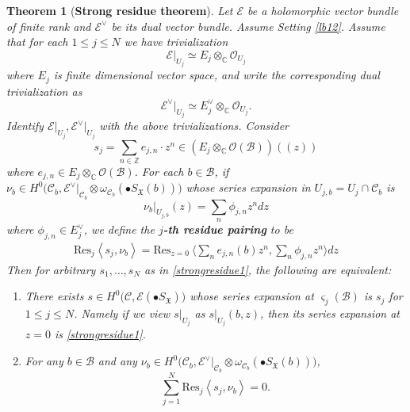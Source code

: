 \documentclass[11pt,b5paper,notitlepage]{article}
\theoremstyle{definition}
\theoremstyle{plain}
\newtheorem{thm}[df]{Theorem}
\newcommand{\mc}{\mathcal}
\newcommand{\Res}{\mathrm{Res}}
\newcommand{\scr}{\mathscr}
\newcommand{\blt}{\bullet}
\newcommand{\Cbb}{\mathbb C}
\newcommand{\Zbb}{\mathbb Z}
\newcommand{\<}{\left\langle}
\renewcommand{\>}{\right\rangle}
\newcommand{\MO}{\mathcal{O}}
\newcommand{\MC}{\mathcal{C}}
\newcommand{\MB}{\mathcal{B}}
\newcommand{\fx}{\mathfrak{X}}
\newcommand{\Bigbk}[1]{\Big\langle {#1}\Big\rangle}
\numberwithin{equation}{section}
\begin{document}
\begin{thm}[\textbf{Strong residue theorem}] \label{strongresidue} \label{lb88}
 Let $\scr E$ be a holomorphic vector bundle of finite rank and $\scr E^\vee$ be its dual vector bundle. Assume Setting \ref{lb12}. Assume that for each $1\leq j\leq N$ we have trivialization
    \begin{equation}\label{strongresidue2}
    \scr E\vert_{U_j}\simeq E_j\otimes_\Cbb \MO_{U_j}
    \end{equation}
where $E_j$ is finite dimensional vector space, and write the corresponding dual trivialization as
    \begin{equation}\label{strongresidue3}
    \scr E^{\vee}\vert_{U_j}\simeq E_j^\vee\otimes_\Cbb \MO_{U_j}.
    \end{equation}
Identify $\scr E\vert_{U_j},\scr E^\vee\vert_{U_j}$ with the above trivializations. Consider
    \begin{equation}\label{strongresidue1}
    s_j=\sum_{n\in \Zbb}e_{j,n}\cdot z^n\in (E_j\otimes_\Cbb \MO(\MB))((z))
    \end{equation}
where $e_{j,n}\in E_j\otimes_\Cbb\mc O(\mc B)$.  For each $b\in \MB$, if $\nu_b\in H^0\big(\MC_b,\scr E^\vee\vert_{\MC_b}\otimes \omega_{\MC_b}(\blt S_\fx(b))\big)$ whose series expansion in $U_{j,b}=U_j\cap \MC_b$ is 
    $$
    \nu_b\vert_{U_{j,b}}(z)=\sum_n \phi_{j,n}z^n dz
    $$
    where $\phi_{j,n}\in E_j^\vee$, we define the \textbf{$j$-th residue pairing} to be
\begin{align}
    \Res_j\<s_j,\nu_b\>=\Res_{z=0}~\Bigbk{\sum_n e_{j,n}(b)z^n,\sum_n \phi_{j,n}z^n}dz
\end{align}
Then for arbitrary $s_1,\dots,s_N$ as in \eqref{strongresidue1},  the following are equivalent:
    \begin{enumerate}[label=(\arabic*)]
        \item There exists $s\in H^0\big(\MC,\scr E(\blt S_\fx)\big)$ whose series expansion at $\varsigma_j(\MB)$ is $s_j$ for $1\leq j\leq N$. Namely if we view $s\vert_{U_j}$ as $s\vert_{U_j}(b,z)$, then its series expansion at $z=0$ is \eqref{strongresidue1}.
        \item  For any $b\in \MB$ and any $\nu_b\in H^0\big(\MC_b,\scr E^\vee\vert_{\MC_b}\otimes \omega_{\MC_b}(\blt S_\fx(b))\big)$, 
        $$
        \sum_{j=1}^N \Res_j\<s_j,\nu_b\>=0.
        $$
    \end{enumerate}
\end{thm}
\end{document}
